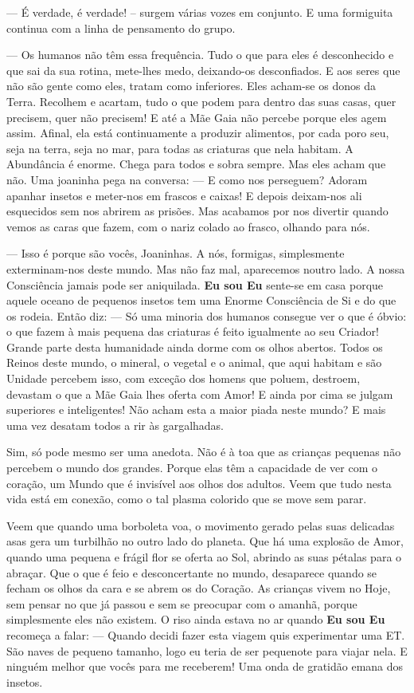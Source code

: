 — É verdade, é verdade! – surgem várias vozes em conjunto. E uma formiguita continua com a linha de pensamento do grupo.

— Os humanos não têm essa frequência. Tudo o que para eles é desconhecido e que sai da sua rotina, mete-lhes medo, deixando-os desconfiados. E aos seres que não são gente como eles, tratam como inferiores. Eles acham-se os donos da Terra. Recolhem e acartam, tudo o que podem para dentro das suas casas, quer precisem, quer não precisem! E até a Mãe Gaia não percebe porque eles agem assim. Afinal, ela está continuamente a produzir alimentos, por cada poro seu, seja na terra, seja no mar, para todas as criaturas que nela habitam. A Abundância é enorme. Chega para todos e sobra sempre. Mas eles acham que não.
\bigbreak
Uma joaninha pega na conversa:
\bigbreak
— E como nos perseguem? Adoram apanhar insetos e meter-nos em frascos e caixas! E depois deixam-nos ali esquecidos sem nos abrirem as prisões. Mas acabamos por nos divertir quando vemos as caras que fazem, com o nariz colado ao frasco, olhando para nós.

— Isso é porque são vocês, Joaninhas. A nós, formigas, simplesmente exterminam-nos deste mundo. Mas não faz mal, aparecemos noutro lado. A nossa Consciência jamais pode ser aniquilada.
\bigbreak
\textbf{Eu sou Eu} sente-se em casa porque aquele oceano de pequenos insetos tem uma Enorme Consciência de Si e do que os rodeia. Então diz:
\bigbreak
— Só uma minoria dos humanos consegue ver o que é óbvio: o que fazem à mais pequena das criaturas é feito igualmente ao seu Criador! Grande parte desta humanidade ainda dorme com os olhos abertos. Todos os Reinos deste mundo, o mineral, o vegetal e o animal, que aqui habitam e são Unidade percebem isso, com exceção dos homens que poluem, destroem, devastam o que a Mãe Gaia lhes oferta com Amor! E ainda por cima se julgam superiores e inteligentes! Não acham esta a maior piada neste mundo?
\bigbreak
E mais uma vez desatam todos a rir às gargalhadas.

Sim, só pode mesmo ser uma anedota.
\bigbreak
Não é à toa que as crianças pequenas não percebem o mundo dos grandes. Porque elas têm a capacidade de ver com o coração, um Mundo que é invisível aos olhos dos adultos.
\bigbreak
Veem que tudo nesta vida está em conexão, como o tal plasma colorido que se move sem parar.

Veem que quando uma borboleta voa, o movimento gerado pelas suas delicadas asas gera um turbilhão no outro lado do planeta.
\bigbreak
Que há uma explosão de Amor, quando uma pequena e frágil flor se oferta ao Sol, abrindo as suas pétalas para o abraçar.
\bigbreak
Que o que é feio e desconcertante no mundo, desaparece quando se fecham os olhos da cara e se abrem os do Coração.
\bigbreak
As crianças vivem no Hoje, sem pensar no que já passou e sem se preocupar com o amanhã, porque simplesmente eles não existem.
\bigbreak
O riso ainda estava no ar quando \textbf{Eu sou Eu} recomeça a falar:
\bigbreak
— Quando decidi fazer esta viagem quis experimentar uma ET. São naves de pequeno tamanho, logo eu teria de ser pequenote para viajar nela. E ninguém melhor que vocês para me receberem!
\bigbreak
Uma onda de gratidão emana dos insetos.

